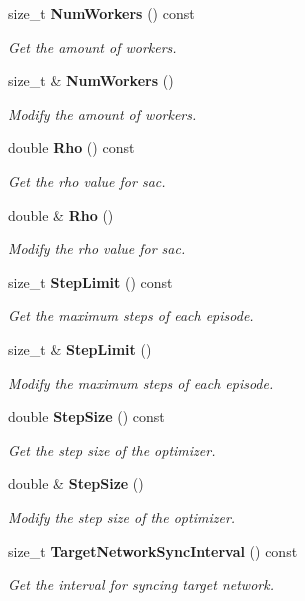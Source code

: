 \begin{DoxyCompactItemize}
size\+\_\+t \textbf{ Num\+Workers} () const
\begin{DoxyCompactList}\small\item\em Get the amount of workers. \end{DoxyCompactList}\item 
size\+\_\+t \& \textbf{ Num\+Workers} ()
\begin{DoxyCompactList}\small\item\em Modify the amount of workers. \end{DoxyCompactList}\item 
double \textbf{ Rho} () const
\begin{DoxyCompactList}\small\item\em Get the rho value for sac. \end{DoxyCompactList}\item 
double \& \textbf{ Rho} ()
\begin{DoxyCompactList}\small\item\em Modify the rho value for sac. \end{DoxyCompactList}\item 
size\+\_\+t \textbf{ Step\+Limit} () const
\begin{DoxyCompactList}\small\item\em Get the maximum steps of each episode. \end{DoxyCompactList}\item 
size\+\_\+t \& \textbf{ Step\+Limit} ()
\begin{DoxyCompactList}\small\item\em Modify the maximum steps of each episode. \end{DoxyCompactList}\item 
double \textbf{ Step\+Size} () const
\begin{DoxyCompactList}\small\item\em Get the step size of the optimizer. \end{DoxyCompactList}\item 
double \& \textbf{ Step\+Size} ()
\begin{DoxyCompactList}\small\item\em Modify the step size of the optimizer. \end{DoxyCompactList}\item 
size\+\_\+t \textbf{ Target\+Network\+Sync\+Interval} () const
\begin{DoxyCompactList}\small\item\em Get the interval for syncing target network. \end{DoxyCompactList}\item 

\end{DoxyCompactItemize}
